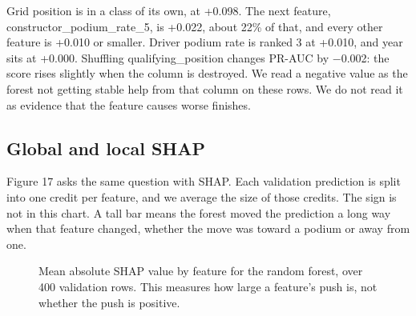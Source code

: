 \documentclass[10pt,a4paper]{article}
\begin{document}
Grid position is in a class of its own, at +0.098. The next feature, constructor\_podium\_rate\_5, is +0.022, about 22\% of that, and every other feature is +0.010 or smaller. Driver podium rate is ranked 3 at +0.010, and year sits at +0.000. Shuffling qualifying\_position changes PR-AUC by $-$0.002: the score rises slightly when the column is destroyed. We read a negative value as the forest not getting stable help from that column on these rows. We do not read it as evidence that the feature causes worse finishes.



\subsection{Global and local SHAP}


Figure 17 asks the same question with SHAP. Each validation prediction is split into one credit per feature, and we average the size of those credits. The sign is not in this chart. A tall bar means the forest moved the prediction a long way when that feature changed, whether the move was toward a podium or away from one.


\begin{figure}[H]
\centering
{}
\caption{Mean absolute SHAP value by feature for the random forest, over 400 validation rows. This measures how large a feature's push is, not whether the push is positive.}
\end{figure}
\end{document}
